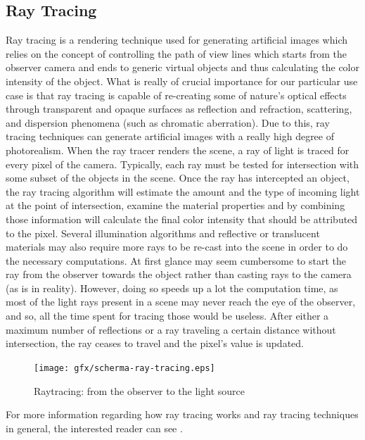 \subsection{Ray Tracing}
Ray tracing is a rendering technique used for generating artificial images which relies on the concept of controlling the path of view lines which starts from the observer camera and ends to generic virtual objects and thus calculating the color intensity of the object.
What is really of crucial importance for our particular use case is that ray tracing is capable of re-creating some of nature's optical effects through transparent and opaque surfaces as reflection and refraction, scattering, and dispersion phenomena (such as chromatic aberration).
Due to this, ray tracing techniques can generate artificial images with a really high degree of photorealism.
When the ray tracer renders the scene, a ray of light is traced for every pixel of the camera. Typically, each ray must be tested for intersection with some subset of the objects in the scene. Once the ray has intercepted an object, the ray tracing algorithm will estimate the amount and the type of incoming light at the point of intersection, examine the material properties and by combining those information will calculate the final color intensity that should be attributed to the pixel.
Several illumination algorithms and reflective or translucent materials may also require more rays to be re-cast into the scene in order to do the necessary computations.
At first glance may seem cumbersome to start the ray from the observer towards the object rather than casting rays to the camera (as is in reality). However, doing so speeds up a lot the computation time, as most of the light rays present in a scene may never reach the eye of the observer, and so, all the time spent for tracing those would be useless.
After either a maximum number of reflections or a ray traveling a certain distance without intersection, the ray ceases to travel and the pixel's value is updated.

\begin{figure}[htbp]
  \centering
  \texttt{[image: gfx/scherma-ray-tracing.eps]}
  \caption{Raytracing: from the observer to the light source \cite{pictraytracing}}
  \label{fig:raytracing}
\end{figure}

For more information regarding how ray tracing works and ray tracing techniques in general, the interested reader can see \cite{introductionraytracing}.

